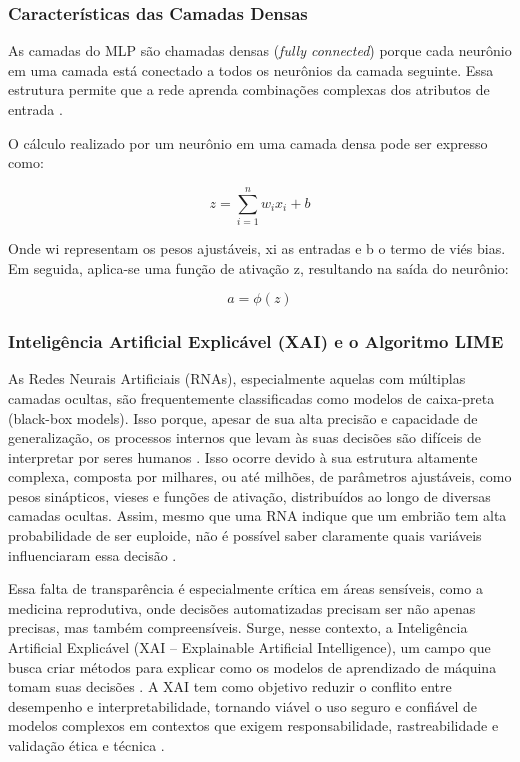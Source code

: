 \subsubsection{Características das Camadas Densas}

As camadas do MLP são chamadas densas (\textit{fully connected}) porque cada neurônio em uma camada está conectado a todos os neurônios da camada seguinte. Essa estrutura permite que a rede aprenda combinações complexas dos atributos de entrada \cite{haykin2009}.

O cálculo realizado por um neurônio em uma camada densa pode ser expresso como:

\begin{equation}
    z = \sum_{i=1}^{n} w_i x_i + b
\end{equation}

Onde wi representam os pesos ajustáveis, xi as entradas e b o termo de viés bias. Em seguida, aplica-se uma função de ativação z, resultando na saída do neurônio:

\begin{equation}
    a = \phi(z)
\end{equation}

\subsubsection{Inteligência Artificial Explicável (XAI) e o Algoritmo LIME}

As Redes Neurais Artificiais (RNAs), especialmente aquelas com múltiplas camadas ocultas, são frequentemente classificadas como modelos de caixa-preta (black-box models). Isso porque, apesar de sua alta precisão e capacidade de generalização, os processos internos que levam às suas decisões são difíceis de interpretar por seres humanos \cite{adadi2018}. Isso ocorre devido à sua estrutura altamente complexa, composta por milhares, ou até milhões, de parâmetros ajustáveis, como pesos sinápticos, vieses e funções de ativação, distribuídos ao longo de diversas camadas ocultas. Assim, mesmo que uma RNA indique que um embrião tem alta probabilidade de ser euploide, não é possível saber claramente quais variáveis influenciaram essa decisão \cite{ribeiro2016}.

Essa falta de transparência é especialmente crítica em áreas sensíveis, como a medicina reprodutiva, onde decisões automatizadas precisam ser não apenas precisas, mas também compreensíveis. Surge, nesse contexto, a Inteligência Artificial Explicável (XAI – Explainable Artificial Intelligence), um campo que busca criar métodos para explicar como os modelos de aprendizado de máquina tomam suas decisões \cite{gilpin2018}. A XAI tem como objetivo reduzir o conflito entre desempenho e interpretabilidade, tornando viável o uso seguro e confiável de modelos complexos em contextos que exigem responsabilidade, rastreabilidade e validação ética e técnica \cite{gilpin2018}.

